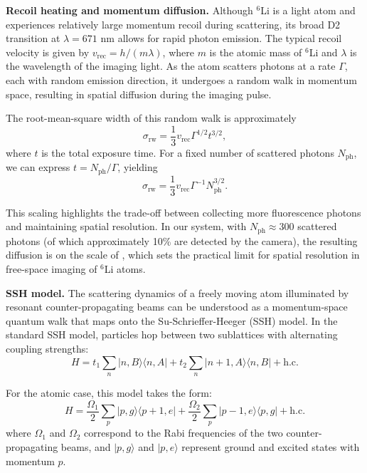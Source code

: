 \textbf{Recoil heating and momentum diffusion.} Although $^6$Li is a light atom and experiences relatively large momentum recoil during scattering, its broad D2 transition at $\lambda = 671$ nm allows for rapid photon emission. The typical recoil velocity is given by $v_\mathrm{rec} = h/(m\lambda)$, where $m$ is the atomic mass of $^6$Li and $\lambda$ is the wavelength of the imaging light. As the atom scatters photons at a rate $\Gamma$, each with random emission direction, it undergoes a random walk in momentum space, resulting in spatial diffusion during the imaging pulse.

The root-mean-square width of this random walk is approximately \cite{kruip_design_2024}
\begin{equation}
\sigma_\mathrm{rw} = \frac{1}{3} v_\mathrm{rec} \Gamma^{1/2} t^{3/2},
\label{eq:sigmarw}
\end{equation}
where $t$ is the total exposure time. For a fixed number of scattered photons $N_\mathrm{ph}$, we can express $t = N_\mathrm{ph}/\Gamma$, yielding
\begin{equation}
\sigma_\mathrm{rw} = \frac{1}{3} v_\mathrm{rec} \Gamma^{-1} N_\mathrm{ph}^{3/2}.
\end{equation}

This scaling highlights the trade-off between collecting more fluorescence photons and maintaining spatial resolution. In our system, with $N_\mathrm{ph} \approx 300$ scattered photons (of which approximately 10\% are detected by the camera), the resulting diffusion is on the scale of , which sets the practical limit for spatial resolution in free-space imaging of $^6$Li atoms.


\textbf{SSH model.} The scattering dynamics of a freely moving atom illuminated by resonant counter-propagating beams can be understood as a momentum-space quantum walk that maps onto the Su-Schrieffer-Heeger (SSH) model. In the standard SSH model, particles hop between two sublattices with alternating coupling strengths:
\begin{equation}
H = t_1 \sum_n |n,B\rangle \langle n,A| + t_2 \sum_n |n+1,A\rangle \langle n,B| + \text{h.c.}
\end{equation}

For the atomic case, this model takes the form:
\begin{equation}
H = \frac{\Omega_1}{2} \sum_p |p,g\rangle \langle p+1,e| + \frac{\Omega_2}{2} \sum_p |p-1,e\rangle \langle p,g| + \text{h.c.}
\end{equation}
where $\Omega_1$ and $\Omega_2$ correspond to the Rabi frequencies of the two counter-propagating beams, and $|p,g\rangle$ and $|p,e\rangle$ represent ground and excited states with momentum $p$.

